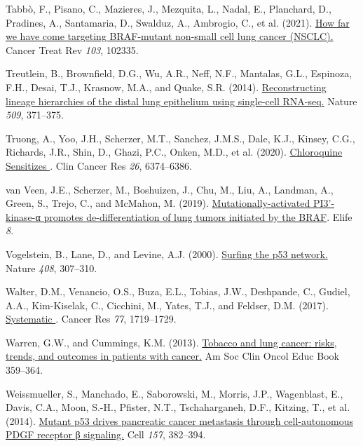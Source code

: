 \begin{CSLReferences}{0}{0}
\leavevmode{}%
Tabbò, F., Pisano, C., Mazieres, J., Mezquita, L., Nadal, E., Planchard, D., Pradines, A., Santamaria, D., Swalduz, A., Ambrogio, C., et al. (2021). \href{https://doi.org/10.1016/j.ctrv.2021.102335}{How far we have come targeting BRAF-mutant non-small cell lung cancer (NSCLC).} Cancer Treat Rev \emph{103}, 102335.

\leavevmode{}%
Treutlein, B., Brownfield, D.G., Wu, A.R., Neff, N.F., Mantalas, G.L., Espinoza, F.H., Desai, T.J., Krasnow, M.A., and Quake, S.R. (2014). \href{https://doi.org/10.1038/nature13173}{Reconstructing lineage hierarchies of the distal lung epithelium using single-cell RNA-seq.} Nature \emph{509}, 371--375.

\leavevmode{}%
Truong, A., Yoo, J.H., Scherzer, M.T., Sanchez, J.M.S., Dale, K.J., Kinsey, C.G., Richards, J.R., Shin, D., Ghazi, P.C., Onken, M.D., et al. (2020). \href{https://doi.org/10.1158/1078-0432.ccr-20-1675}{Chloroquine Sensitizes }. Clin Cancer Res \emph{26}, 6374--6386.

\leavevmode{}%
van Veen, J.E., Scherzer, M., Boshuizen, J., Chu, M., Liu, A., Landman, A., Green, S., Trejo, C., and McMahon, M. (2019). \href{https://doi.org/10.7554/elife.43668}{Mutationally-activated PI3'-kinase-α promotes de-differentiation of lung tumors initiated by the BRAF}. Elife \emph{8}.

\leavevmode{}%
Vogelstein, B., Lane, D., and Levine, A.J. (2000). \href{https://doi.org/10.1038/35042675}{Surfing the p53 network.} Nature \emph{408}, 307--310.

\leavevmode{}%
Walter, D.M., Venancio, O.S., Buza, E.L., Tobias, J.W., Deshpande, C., Gudiel, A.A., Kim-Kiselak, C., Cicchini, M., Yates, T.J., and Feldser, D.M. (2017). \href{https://doi.org/10.1158/0008-5472.can-16-2159}{Systematic }. Cancer Res \emph{77}, 1719--1729.

\leavevmode{}%
Warren, G.W., and Cummings, K.M. (2013). \href{https://doi.org/10.14694/edbook_am.2013.33.359}{Tobacco and lung cancer: risks, trends, and outcomes in patients with cancer.} Am Soc Clin Oncol Educ Book 359--364.

\leavevmode{}%
Weissmueller, S., Manchado, E., Saborowski, M., Morris, J.P., Wagenblast, E., Davis, C.A., Moon, S.-H., Pfister, N.T., Tschaharganeh, D.F., Kitzing, T., et al. (2014). \href{https://doi.org/10.1016/j.cell.2014.01.066}{Mutant p53 drives pancreatic cancer metastasis through cell-autonomous PDGF receptor β signaling.} Cell \emph{157}, 382--394.


\end{CSLReferences}
